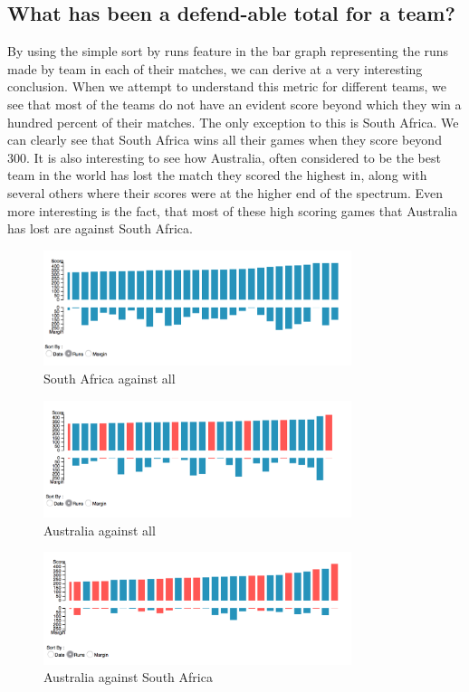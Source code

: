 \documentclass[10pt,journal,compsoc]{IEEEtran}
\begin{document}
\subsection{What has been a defend-able total for a team?}
By using the simple sort by runs feature in the bar graph representing the runs made by team in each of their matches, we can derive at a very interesting conclusion. When we attempt to understand this metric for different teams, we see that most of the teams do not have an evident score beyond which they win a hundred percent of their matches. The only exception to this is South Africa. We can clearly see that South Africa wins all their games when they score beyond $300$. It is also interesting to see how Australia, often considered to be the best team in the world has lost the match they scored the highest in, along with several others where their scores were at the higher end of the spectrum. Even more interesting is the fact, that most of these high scoring games that Australia has lost are against South Africa. 

\begin{figure}[ht]
\includegraphics[width=9cm]{south_africa_against_all.png}
\caption{South Africa against all}
\label{fig:south_africa_against_all}
\end{figure}

\begin{figure}[ht]
\includegraphics[width=9cm]{australia_against_all.png}
\caption{Australia against all}
\label{fig:australia_against_all}
\end{figure}

\begin{figure}[ht]
\includegraphics[width=9cm]{australia_against_southAfrica.png}
\caption{Australia against South Africa}
\label{fig:australia_against_southAfrica}
\end{figure}
\end{document}
